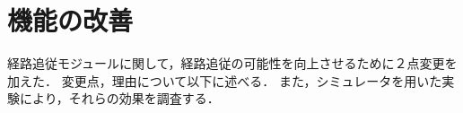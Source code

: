 \chapter{機能の改善}
\label{chap:method}
経路追従モジュールに関して，経路追従の可能性を向上させるために２点変更を加えた．
変更点，理由について以下に述べる．
また，シミュレータを用いた実験により，それらの効果を調査する．




